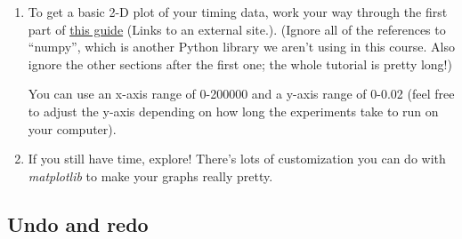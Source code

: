 \documentclass[12pt]{article}
\begin{document}
\begin{enumerate}[1.]
    \item To get a basic 2-D plot of your timing data, work your way through the
    first part of \href{https://matplotlib.org/users/pyplot_tutorial.html}{this guide} (Links to an external site.). (Ignore all of the
    references to “numpy”, which is another Python library we aren’t using in this
    course. Also ignore the other sections after the first one; the whole tutorial
    is pretty long!)

    \bigskip

    You can use an x-axis range of 0-200000 and a y-axis range of 0-0.02 (feel
    free to adjust the y-axis depending on how long the experiments take to run
    on your computer).

    \item If you still have time, explore! There’s lots of customization you can
    do with \textit{matplotlib} to make your graphs really pretty.
\end{enumerate}

\subsection*{Undo and redo}
\end{document}
